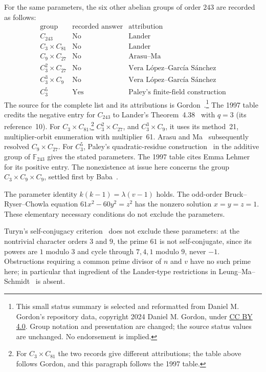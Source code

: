 \documentclass[11pt]{article}
\begin{document}
\begin{appendices}
For the same parameters, the six other abelian groups of order $243$
are recorded as follows:
\[
\begin{array}{c|c|l}
\text{group}&\text{recorded answer}&\text{attribution}\\\hline
C_{243}&\text{No}&\text{Lander}\\
C_3\times C_{81}&\text{No}&\text{Lander}\\
C_9\times C_{27}&\text{No}&\text{Arasu--Ma}\\
C_3^2\times C_{27}&\text{No}&\text{Vera L\'opez--Garc\'ia S\'anchez}\\
C_3^3\times C_9&\text{No}&\text{Vera L\'opez--Garc\'ia S\'anchez}\\
C_3^5&\text{Yes}&\text{Paley's finite-field construction}
\end{array}
\]
The source for the complete list and its attributions is
Gordon~\cite{GordonData}.\footnote{This small status summary is selected
and reformatted from Daniel M. Gordon's repository data, copyright
2024 Daniel M. Gordon, under
\href{https://creativecommons.org/licenses/by/4.0/}{CC BY 4.0}.
Group notation and presentation are changed; the source status
values are unchanged. No endorsement is implied.}
The 1997 table credits the negative entry for $C_{243}$ to
Lander's Theorem~4.38~\cite{Lander1983} with $q=3$ (its reference~10). For
$C_3\times C_{81}$,\footnote{For $C_3\times C_{81}$ the two records give
different attributions; the table above follows Gordon, and this
paragraph follows the 1997 table.} $C_3^2\times C_{27}$, and
$C_3^3\times C_9$, it uses its method~21, multiplier-orbit enumeration
with multiplier~61.
Arasu and
Ma~\cite{ArasuMa2001} subsequently resolved $C_9\times C_{27}$.
For $C_3^5$, Paley's quadratic-residue construction~\cite{Paley1933}
in the additive group of $\mathbb F_{243}$ gives the stated parameters.
The 1997 table cites Emma Lehmer~\cite{Lehmer1953} for its positive entry.
The nonexistence at issue here concerns
the group $C_3\times C_9\times C_9$, settled first by Baba~\cite{Baba2026}.

The parameter identity $k(k-1)=\lambda(v-1)$ holds. The odd-order
Bruck--Ryser--Chowla equation $61x^2-60y^2=z^2$ has the nonzero
solution $x=y=z=1$. These elementary necessary conditions do not
exclude the parameters.

Turyn's self-conjugacy criterion~\cite{Turyn1965} does not exclude
these parameters: at the nontrivial character orders $3$ and $9$, the
prime $61$ is not self-conjugate, since its powers are $1$ modulo $3$
and cycle through $7,4,1$ modulo $9$, never $-1$. Obstructions requiring
a common prime divisor of $n$ and
$v$ have no such prime here; in particular that ingredient of the
Lander-type restrictions in Leung--Ma--Schmidt~\cite{LeungMaSchmidt2004}
is absent.


\end{appendices}
\end{document}
